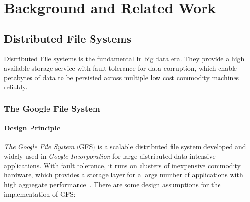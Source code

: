 
%
%


\chapter{Background and Related Work}
\label{ch:Background}

%





\section{Distributed File Systems}

Distributed File systems is the fundamental in big data era. They provide a high available storage service with fault tolerance for data corruption, which enable petabytes of data to be persisted across multiple low cost commodity machines reliably.

\subsection{The Google File System}

\subsubsection{Design Principle}
\textit{The Google File System} (GFS) is a scalable distributed file system developed and widely used in \textit{Google Incorporation} for large distributed data-intensive applications. With fault tolerance, it runs on clusters of inexpensive commodity hardware, which provides a storage layer for a large number of applications with high aggregate performance~\cite{ghemawat2003google}. There are some design assumptions for the implementation of GFS:

